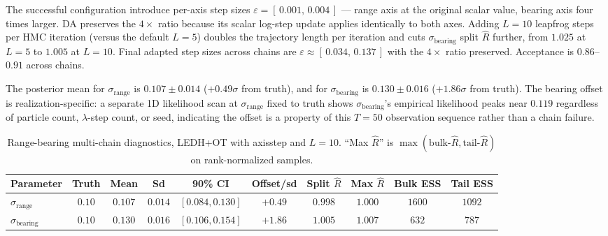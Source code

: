 \documentclass{article}
\begin{document}

The successful configuration introduce per-axis step sizes $\varepsilon = [\,0.001,\,0.004\,]$ --- range axis at the original scalar value, bearing axis four times larger. DA preserves the $4\times$ ratio because its scalar log-step update applies identically to both axes.  Adding $L = 10$ leapfrog steps per HMC iteration (versus the default $L = 5$) doubles the trajectory length per iteration and cuts $\sigma_{\text{bearing}}$ split $\hat R$ further, from $1.025$ at $L = 5$ to $1.005$ at $L = 10$. Final adapted step sizes across chains are $\varepsilon \approx [\,0.034,\,0.137\,]$ with the $4\times$ ratio preserved. Acceptance is $0.86$--$0.91$ across chains.

The posterior mean for $\sigma_{\text{range}}$ is $0.107 \pm 0.014$ ($+0.49\sigma$ from truth), and for $\sigma_{\text{bearing}}$ is $0.130 \pm 0.016$ ($+1.86\sigma$ from truth). The bearing offset is realization-specific: a separate 1D likelihood scan at $\sigma_{\text{range}}$ fixed to truth shows $\sigma_{\text{bearing}}$'s empirical likelihood peaks near $0.119$ regardless of particle count, $\lambda$-step count, or seed, indicating the offset is a property of this $T = 50$ observation sequence rather than a chain failure.

\begin{table}[H]
\centering
\footnotesize
\caption{Range-bearing multi-chain diagnostics, LEDH+OT with axisstep and $L=10$. ``Max $\hat R$'' is $\max(\text{bulk-}\hat R, \text{tail-}\hat R)$ on rank-normalized samples.}
\label{tab:hmc_multichain_rb}
\begin{tabular}{lccccccccc}
\toprule
Parameter & Truth & Mean & Sd & 90\% CI & Offset/sd & Split $\hat R$ & Max $\hat R$ & Bulk ESS & Tail ESS \\
\midrule
$\sigma_{\text{range}}$  & $0.10$ & $0.107$ & $0.014$ & $[0.084, 0.130]$ & $+0.49$ & $0.998$ & $1.000$ & $1600$ & $1092$ \\
$\sigma_{\text{bearing}}$ & $0.10$ & $0.130$ & $0.016$ & $[0.106, 0.154]$ & $+1.86$ & $1.005$ & $1.007$ & $632$  & $787$  \\
\bottomrule
\end{tabular}
\end{table}
\end{document}

